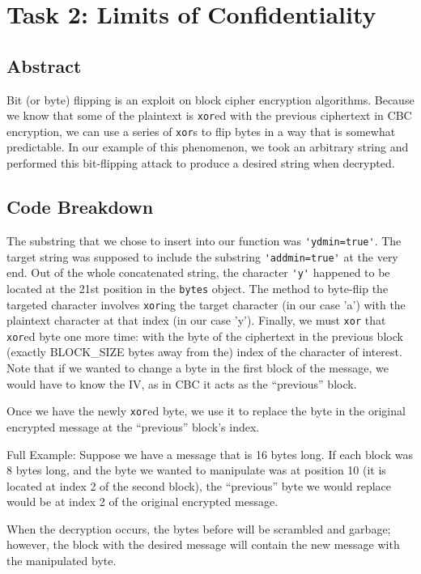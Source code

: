\documentclass[11pt]{article}
\begin{document}
\section*{Task 2: Limits of Confidentiality}
\subsection*{Abstract}

Bit (or byte) flipping is an exploit on block cipher encryption algorithms. Because we know that some of the plaintext is \verb|xor|ed with the previous ciphertext in CBC encryption, we can use a series of \verb|xor|s to flip bytes in a way that is somewhat predictable. In our example of this phenomenon, we took an arbitrary string and performed this bit-flipping attack to produce a desired string when decrypted.

\subsection*{Code Breakdown}

The substring that we chose to insert into our function was \verb|'ydmin=true'|. The target string was supposed to include the substring \verb|'addmin=true'| at the very end. Out of the whole concatenated string, the character \verb|'y'| happened to be located at the 21st position in the \verb|bytes| object. The method to byte-flip the targeted character involves \verb|xor|ing the target character (in our case 'a') with the plaintext character at that index (in our case 'y'). Finally, we must \verb|xor| that \verb|xor|ed byte one more time: with the byte of the ciphertext in the previous block (exactly BLOCK\_SIZE bytes away from the) index of the character of interest. Note that if we wanted to change a byte in the first block of the message, we would have to know the IV, as in CBC it acts as the ``previous'' block.

Once we have the newly \verb|xor|ed byte, we use it to replace the byte in the original encrypted message at the ``previous'' block's index.

Full Example: Suppose we have a message that is 16 bytes long. If each block was 8 bytes long, and the byte we wanted to manipulate was at position 10 (it is located at index 2 of the second block), the ``previous'' byte we would replace would be at index 2 of the original encrypted message.

When the decryption occurs, the bytes before will be scrambled and garbage; however, the block with the desired message will contain the new message with the manipulated byte.
\end{document}
